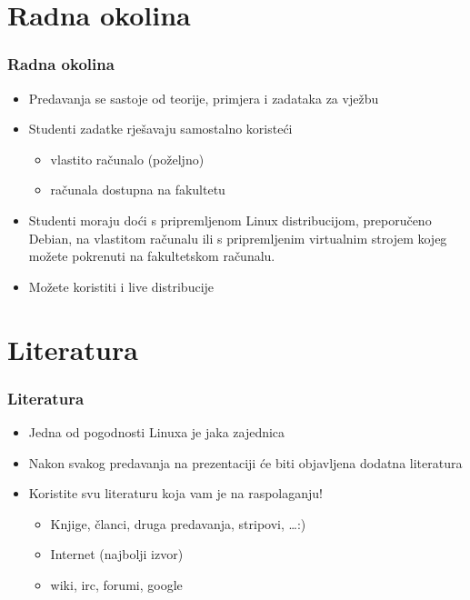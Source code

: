 \documentclass{beamer}
\begin{document}
\section{Radna okolina}
\begin{frame}[t]
\frametitle{Radna okolina}
\begin{itemize}
	\item Predavanja se sastoje od teorije, primjera i zadataka za vježbu
	\item Studenti zadatke rješavaju samostalno koristeći
	\begin{itemize}
		\item vlastito računalo (poželjno)
		\item računala dostupna na fakultetu
	\end{itemize}
	\item Studenti moraju doći s pripremljenom Linux distribucijom, preporučeno Debian, na vlastitom računalu ili s pripremljenim virtualnim strojem kojeg možete pokrenuti na fakultetskom računalu.
	\item Možete koristiti i live distribucije
\end{itemize}
\end{frame}

\section{Literatura}
\begin{frame}[t]
\frametitle{Literatura}
\begin{itemize}
	\item Jedna od pogodnosti Linuxa je jaka zajednica
	\item Nakon svakog predavanja na prezentaciji će biti objavljena dodatna literatura
	\item Koristite svu literaturu koja vam je na raspolaganju!
	\begin{itemize}
		\item Knjige, članci, druga predavanja, stripovi, \ldots :)
		\item Internet (najbolji izvor)
		\item wiki, irc, forumi, google 
	\end{itemize}
\end{itemize}
\end{frame}
\end{document}
